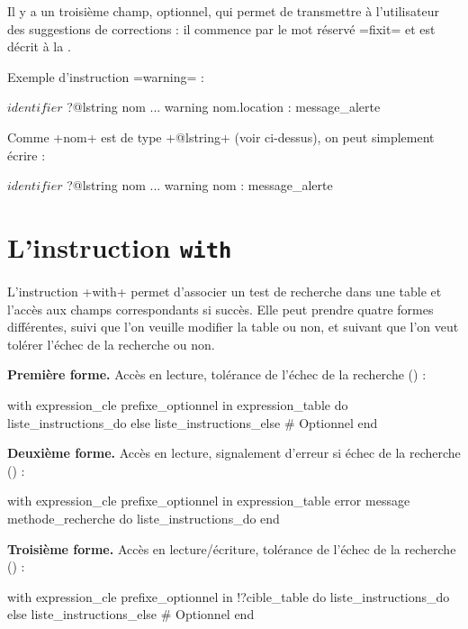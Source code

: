 Il y a un troisième champ, optionnel, qui permet de transmettre à l'utilisateur des suggestions de corrections : il commence par le mot réservé \ggs=fixit= et est décrit à la .

Exemple d'instruction \ggs=warning= :

\begin{galgas}
$identifier$ ?@lstring nom
...
warning nom.location : message_alerte
\end{galgas}

Comme \ggs+nom+ est de type \ggs+@lstring+ (voir ci-dessus), on peut simplement écrire :
\begin{galgas}
$identifier$ ?@lstring nom
...
warning nom : message_alerte
\end{galgas}










\section{L'instruction \texttt{with}}

L'instruction \ggs+with+ permet d'associer un test de recherche dans une table et l'accès aux champs correspondants si succès. Elle peut prendre quatre formes différentes, suivi que l'on veuille modifier la table ou non, et suivant que l'on veut tolérer l'échec de la recherche ou non.

\textbf{Première forme.} Accès en lecture, tolérance de l'échec de la recherche () :
\begin{galgas}
with expression_cle prefixe_optionnel in expression_table
do
  liste_instructions_do
else
  liste_instructions_else # Optionnel
end
\end{galgas}

\textbf{Deuxième forme.} Accès en lecture, signalement d'erreur si échec de la recherche () :
\begin{galgas}
with expression_cle prefixe_optionnel in expression_table
error message methode_recherche
do
  liste_instructions_do
end
\end{galgas}



\textbf{Troisième forme.} Accès en lecture/écriture, tolérance de l'échec de la recherche () :
\begin{galgas}
with expression_cle prefixe_optionnel in !?cible_table
do
  liste_instructions_do
else
  liste_instructions_else # Optionnel
end
\end{galgas}

